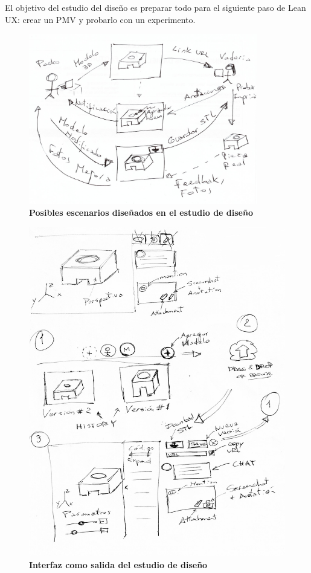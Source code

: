 El objetivo del estudio del diseño es preparar todo para el siguiente paso de Lean UX: crear un PMV y probarlo con un experimento.

\begin{figure}[h]
\includegraphics[width=10cm]{Img/UX/ed2.jpg}
\centering
\caption{\textbf{ \footnotesize{Posibles escenarios diseñados en el estudio de diseño}}}
\end{figure}

\begin{figure}[h]
\includegraphics[width=12cm]{Img/UX/ed.jpg}
\centering
\caption{\textbf{ \footnotesize{Interfaz como salida del estudio de diseño}}}
\end{figure}

